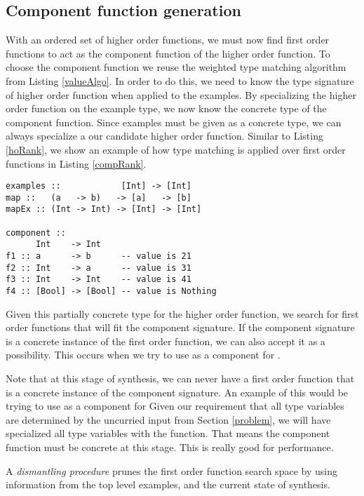 \subsection{Component function generation}\label{makeFxns}

With an ordered set of higher order functions, we must now find first order functions to act as the component function of the higher order function.
To choose the component function we reuse the weighted type matching algorithm from Listing \ref{valueAlgo}.
In order to do this, we need to know the type signature of higher order function when applied to the examples.
By specializing the higher order function on the example type, we now know the concrete type of the component function.
Since examples must be given as a concrete type, we can always specialize a our candidate higher order function. 
Similar to Listing \ref{hoRank}, we show an example of how type matching is applied over first order functions in Listing \ref{compRank}.

\begin{lstlisting}[caption=Ranking component function,label=comprank]
examples ::            [Int] -> [Int]
map ::   (a   -> b)   -> [a]   -> [b]
mapEx :: (Int -> Int) -> [Int] -> [Int]

component ::
      Int    -> Int
f1 :: a      -> b      -- value is 21
f2 :: Int    -> a      -- value is 31
f3 :: Int    -> Int    -- value is 41
f4 :: [Bool] -> [Bool] -- value is Nothing
\end{lstlisting}


Given this partially concrete type for the higher order function, we search for first order functions that will fit the component signature.
If the component signature is a concrete instance of the first order function, we can also accept it as a possibility.
This occurs when we try to use  as a component for .

Note that at this stage of synthesis, we can never have a first order function that is a concrete instance of the component signature. 
An example of this would be trying to use  as a component for 
Given our requirement that all type variables are determined by the uncurried input from Section \ref{problem}, we will have specialized all type variables with the  function.
That means the component function must be concrete at this stage.
This is really good for performance.

A \textit{dismantling procedure} prunes the first order function search space by using information from the top level examples, and the current state of synthesis.

